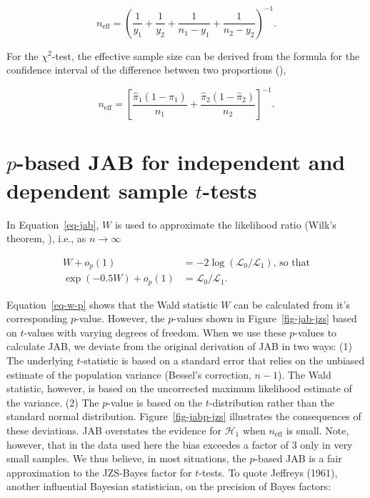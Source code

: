 \documentclass[
  man,
  floatsintext,
  longtable,
  nolmodern,
  notxfonts,
  notimes,
  colorlinks=true,linkcolor=blue,citecolor=blue,urlcolor=blue]{apa7}
\begin{document}
\[
n_\text{eff} = \left(\frac{1}{y_1} + \frac{1}{y_2} + \frac{1}{n_1 - y_1} + \frac{1}{n_2 - y_2}\right)^{-1}.
\]

For the \(\chi^2\)-test, the effective sample size can be derived from
the formula for the confidence interval of the difference between two
proportions (),

\[
n_\text{eff} = \left[\frac{\hat{\pi}_1(1-\hat{\pi}_1)}{n_1} + \frac{\hat{\pi}_2(1-\hat{\pi}_2)}{n_2}\right]^{-1}.
\]

\section{\texorpdfstring{\(p\)-based JAB for independent and dependent
sample
\(t\)-tests}{p-based JAB for independent and dependent sample t-tests}}\label{sec-appendix-llr}

In Equation~\ref{eq-jab}, \(W\) is used to approximate the likelihood
ratio (Wilk's theorem, ), i.e., as
\(n \to \infty\)

\[
\begin{aligned}
W + o_p(1) & = -2 \log(\mathcal{L}_{0} / \mathcal{L}_{1}) \text{, so that} \\
\exp(-0.5 W) + o_p(1) & = \mathcal{L}_{0} / \mathcal{L}_{1}.
\end{aligned}
\]

Equation~\ref{eq-w-p} shows that the Wald statistic \(W\) can be
calculated from it's corresponding \(p\)-value. However, the
\(p\)-values shown in Figure~\ref{fig-jab-jzs} based on \(t\)-values
with varying degrees of freedom. When we use these \(p\)-values to
calculate JAB, we deviate from the original derivation of JAB in two
ways: (1) The underlying \(t\)-statistic is based on a standard error
that relies on the unbiased estimate of the population variance
(Bessel's correction, \(n - 1\)). The Wald statistic, however, is based
on the uncorrected maximum likelihood estimate of the variance. (2) The
\(p\)-value is based on the \(t\)-distribution rather than the standard
normal distribution. Figure~\ref{fig-jabp-jzs} illustrates the
consequences of these deviations. JAB overstates the evidence for
\(\mathcal{H}_1\) when \(n_\text{eff}\) is small. Note, however, that in
the data used here the bias exceedes a factor of 3 only in very small
samples. We thus believe, in most situations, the \(p\)-based JAB is a
fair approximation to the JZS-Bayes factor for \(t\)-tests. To quote
Jeffreys (1961), another influential Bayesian statistician, on the
precision of Bayes factors:
\end{document}
